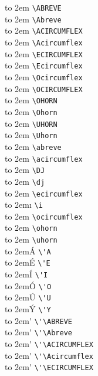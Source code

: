 
\large
\def\X#1{\hbox to 2em{\hss#1\hss}}
\begin{multicols}{2}
\noindent
\X{\ABREVE} \verb|\ABREVE| \\
\X{\Abreve} \verb|\Abreve| \\
\X{\ACIRCUMFLEX} \verb|\ACIRCUMFLEX| \\
\X{\Acircumflex} \verb|\Acircumflex| \\
\X{\ECIRCUMFLEX} \verb|\ECIRCUMFLEX| \\
\X{\Ecircumflex} \verb|\Ecircumflex| \\
\X{\Ocircumflex} \verb|\Ocircumflex| \\
\X{\OCIRCUMFLEX} \verb|\OCIRCUMFLEX| \\
\X{\OHORN} \verb|\OHORN| \\
\X{\Ohorn} \verb|\Ohorn| \\
\X{\UHORN} \verb|\UHORN| \\
\X{\Uhorn} \verb|\Uhorn| \\
\X{\abreve} \verb|\abreve| \\
\X{\acircumflex} \verb|\acircumflex| \\
\X{\DJ} \verb|\DJ| \\
\X{\dj} \verb|\dj| \\
\X{\ecircumflex} \verb|\ecircumflex| \\
\X{\i} \verb|\i| \\
\X{\ocircumflex} \verb|\ocircumflex| \\
\X{\ohorn} \verb|\ohorn| \\
\X{\uhorn} \verb|\uhorn| \\
\X{\'A} \verb|\'A| \\
\X{\'E} \verb|\'E| \\
\X{\'I} \verb|\'I| \\
\X{\'O} \verb|\'O| \\
\X{\'U} \verb|\'U| \\
\X{\'Y} \verb|\'Y| \\
\X{\'\ABREVE} \verb|\'\ABREVE| \\
\X{\'\Abreve} \verb|\'\Abreve| \\
\X{\'\ACIRCUMFLEX} \verb|\'\ACIRCUMFLEX| \\
\X{\'\Acircumflex} \verb|\'\Acircumflex| \\
\X{\'\ECIRCUMFLEX} \verb|\'\ECIRCUMFLEX| \\

\end{multicols}
